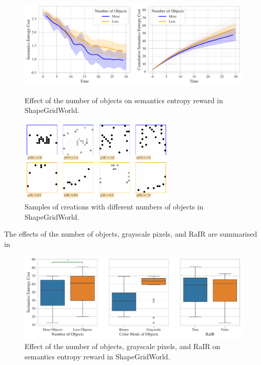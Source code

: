 \begin{figure}[H]
    \centering
    \includegraphics[width=\textwidth]{images/n_objects_comparison_sgw.pdf}
    \caption{Effect of the number of objects on semantics entropy reward in ShapeGridWorld.}
    \label{fig:n-objects-sgw}
    \includegraphics[width=0.66\textwidth]{images/n_objects_samples_sgw.pdf}
    \caption{Samples of creations with different numbers of objects in ShapeGridWorld.}
    \label{fig:n-objects-samples-sgw}
\end{figure}

The effects of the number of objects, grayscale pixels, and RaIR are summarised in 
\begin{figure}[H]
    \centering
    \includegraphics[width=\textwidth]{images/nobj_mode_rair_sgw_boxplot.pdf}
    \caption{Effect of the number of objects, grayscale pixels, and RaIR on semantics entropy reward in ShapeGridWorld.}
    \label{fig:nobj-mode-sgw}
\end{figure}


